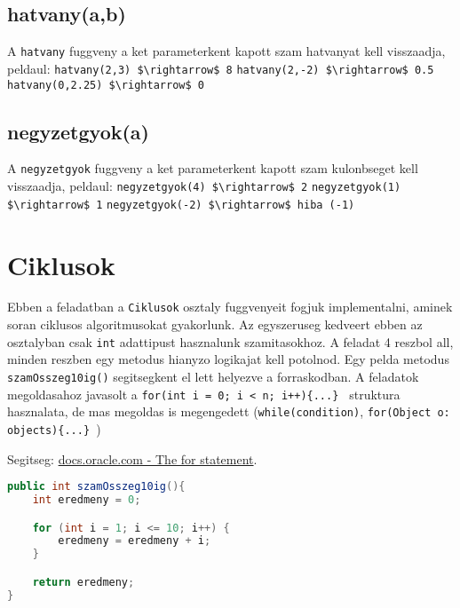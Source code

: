 \documentclass{article}
\begin{document}
\subsection{hatvany(a,b)}
A \lstinline{hatvany} fuggveny a ket parameterkent kapott szam hatvanyat kell visszaadja, peldaul:\newline
\lstinline[mathescape]{hatvany(2,3) $\rightarrow$ 8}\newline
\lstinline[mathescape]{hatvany(2,-2) $\rightarrow$ 0.5}\newline
\lstinline[mathescape]{hatvany(0,2.25) $\rightarrow$ 0}\newline

\subsection{negyzetgyok(a)}
A \lstinline{negyzetgyok} fuggveny a ket parameterkent kapott szam kulonbseget kell visszaadja,
peldaul:\newline
\lstinline[mathescape]{negyzetgyok(4) $\rightarrow$ 2}\newline
\lstinline[mathescape]{negyzetgyok(1) $\rightarrow$ 1}\newline
\lstinline[mathescape]{negyzetgyok(-2) $\rightarrow$ hiba (-1)}\newline

\newpage
\section{Ciklusok}

Ebben a feladatban a \lstinline{Ciklusok} osztaly fuggvenyeit fogjuk implementalni, aminek soran ciklusos algoritmusokat gyakorlunk. Az egyszeruseg kedveert ebben az osztalyban csak \lstinline{int} adattipust hasznalunk szamitasokhoz. A feladat 4 reszbol all, minden reszben egy metodus hianyzo logikajat kell potolnod. Egy pelda metodus \lstinline{szamOsszeg10ig()} segitsegkent el lett helyezve a forraskodban. A feladatok megoldasahoz javasolt a \lstinline|for(int i = 0; i < n; i++){...} | struktura hasznalata, de mas megoldas is megengedett (\lstinline{while(condition)}, \newline \lstinline|for(Object o: objects){...} |)\

Segitseg: \href{https://docs.oracle.com/javase/tutorial/java/nutsandbolts/for.html}{docs.oracle.com - The for statement}.

\begin{lstlisting}[language=Java, caption=Pelda Metodus]
public int szamOsszeg10ig(){
    int eredmeny = 0;

    for (int i = 1; i <= 10; i++) {
        eredmeny = eredmeny + i;
    }

    return eredmeny;
}
\end{lstlisting}
\end{document}
